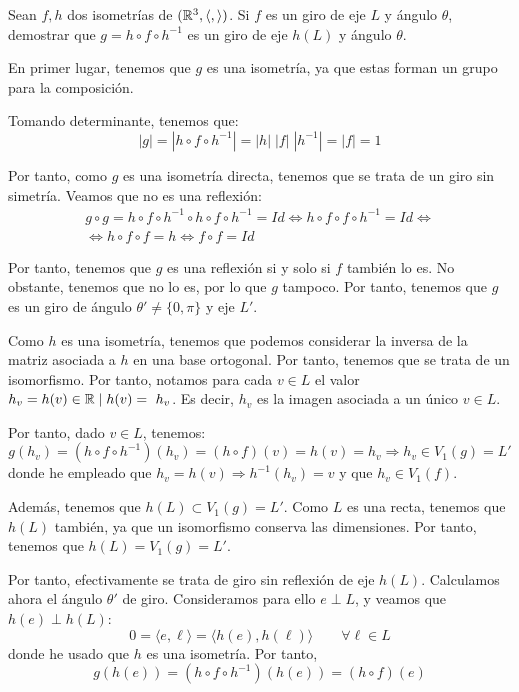 \begin{ejercicio}
    Sean $f, h$ dos isometrías de $(\mathbb{R}^3, \langle,\rangle)$. Si $f$ es un giro de eje $L$ y ángulo $\theta$, demostrar que $g=h\circ f \circ h^{-1}$ es un giro de eje $h(L)$ y ángulo $\theta$.

    En primer lugar, tenemos que $g$ es una isometría, ya que estas forman un grupo para la composición.

    Tomando determinante, tenemos que:
    \begin{equation*}
        |g| = |h\circ f\circ h^{-1}| = |h|\;|f|\;|h^{-1}| = |f| = 1
    \end{equation*}

    Por tanto, como $g$ es una isometría directa, tenemos que se trata de un giro sin simetría. Veamos que no es una reflexión:
    \begin{multline*}
        g\circ g = h\circ f\circ h^{-1} \circ h\circ f\circ h^{-1} = Id \Longleftrightarrow h\circ f\circ f \circ h^{-1} = Id 
        \Longleftrightarrow\\\Longleftrightarrow h\circ f\circ f = h
        \Longleftrightarrow f\circ f=Id
    \end{multline*}

    Por tanto, tenemos que $g$ es una reflexión si y solo si $f$ también lo es. No obstante, tenemos que no lo es, por lo que $g$ tampoco. Por tanto, tenemos que $g$ es un giro de ángulo $\theta'\neq \{0,\pi\}$ y eje $L'$.

    Como $h$ es una isometría, tenemos que podemos considerar la inversa de la matriz asociada a $h$ en una base ortogonal. Por tanto, tenemos que se trata de un isomorfismo. Por tanto,
    notamos para cada $v\in L$ el valor $h_v =h(v) \in \mathbb{R}\mid h(v)=~h_v$. Es decir, $h_v$ es la imagen asociada a un único $v\in L$.

    Por tanto, dado $v\in L$, tenemos:
    \begin{equation*}
        g(h_v) = (h\circ f\circ h^{-1})(h_v) = (h\circ f)(v) = h(v) = h_v \Longrightarrow h_v\in V_1(g) = L'
    \end{equation*}
    donde he empleado que $h_v = h(v)\Longrightarrow h^{-1}(h_v) = v$ y que $h_v\in V_1(f)$. 

    Además, tenemos que $h(L)\subset V_1(g) = L'$. Como $L$ es una recta, tenemos que $h(L)$ también, ya que un isomorfismo conserva las dimensiones. Por tanto, tenemos que $h(L) = V_1(g) = L'$.

    Por tanto, efectivamente se trata de giro sin reflexión de eje $h(L)$. Calculamos ahora el ángulo $\theta '$ de giro. Consideramos para ello $e\perp L$, y veamos que $h(e)\perp h(L)$:
    \begin{equation*}
        0 = \langle e,\ell \rangle = \langle h(e), h(\ell)\rangle \qquad \forall \ell \in L
    \end{equation*}
    donde he usado que $h$ es una isometría. Por tanto,
    \begin{equation*}
        g(h(e)) = (h \circ f \circ h^{-1})(h(e)) = (h\circ f)(e)
    \end{equation*}


\end{ejercicio}
